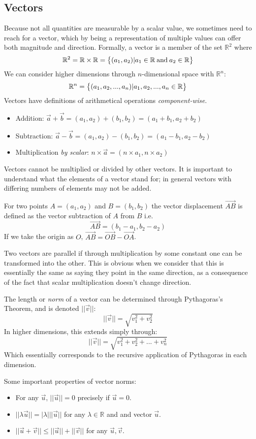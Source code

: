 \documentclass[12pt]{report}
\newcommand{\R}{\mathbb{R}}
\begin{document}
\begin{flushleft}
\section*{Vectors}
Because not all quantities are measurable by a scalar value, we sometimes need to reach
for a vector, which by being a representation of multiple values can offer both magnitude
and direction. Formally, a vector is a member of the set \(\R^2\) where
\[\R^2 = \R \times \R = \set{(a_1, a_2) | a_1 \in \R \:\mathrm{and}\: a_2 \in \R}\]
We can consider higher dimensions through \(n\)-dimensional space with \(\R^n\):
\[\R^n = \set{(a_1, a_2, ..., a_n) | a_1, a_2, ..., a_n \in \R}\]
Vectors have definitions of arithmetical operations \textit{component-wise}.
\begin{itemize}
    \item Addition: \(\vec{a} + \vec{b} = (a_1, a_2) + (b_1, b_2) = (a_1 + b_1, a_2 + b_2)\)
    \item Subtraction: \(\vec{a} - \vec{b} = (a_1, a_2) - (b_1, b_2) = (a_1 - b_1, a_2 - b_2)\)
    \item Multiplication \textit{by scalar}: \(n \times \vec{a} = (n \times a_1, n \times a_2)\)
\end{itemize}
Vectors cannot be multiplied or divided by other vectors. It is important to understand
what the elements of a vector stand for; in general vectors with differing numbers of
elements may not be added.

\bigskip
For two points \(A = (a_1, a_2)\) and \(B = (b_1, b_2)\) the vector displacement \(\vec{AB}\) is
defined as the vector subtraction of \(A\) from \(B\) i.e.
\[\vec{AB} = (b_1 - a_1, b_2 - a_2)\]
If we take the origin as \(O\), \(\vec{AB} = \vec{OB} - \vec{OA}\).

\bigskip
Two vectors are parallel if through multiplication by some constant one can
be transformed into the other. This is obvious when we consider that this is essentially
the same as saying they point in the same direction, as a consequence of the
fact that scalar multiplication doesn't change direction.

\bigskip
The length or \textit{norm} of a vector can be determined through Pythagoras's Theorem, and is
denoted \(||\vec{v}||\):
\[||\vec{v}|| = \sqrt{v_1^2 + v_2^2}\]
In higher dimensions, this extends simply through:
\[||\vec{v}|| = \sqrt{v_1^2 + v_2^2 + ... + v_n^2}\]
Which essentially corresponds to the recursive application of Pythagoras in each
dimension.

\bigskip
Some important properties of vector norms:
\begin{itemize}
    \item For any \(\vec{u}\), \(||\vec{u}|| = 0\) precisely if 
    \(\vec{u} = 0\).
    \item \(||\lambda\vec{u}|| = |\lambda|||\vec{u}||\) for any 
    \(\lambda\in\R\) and and vector \(\vec{u}\).
    \item \(||\vec{u} + \vec{v}|| \leq ||\vec{u}|| + ||\vec{v}||\) for any
    \(\vec{u}, \vec{v}\).
\end{itemize}


\end{flushleft}
\end{document}
